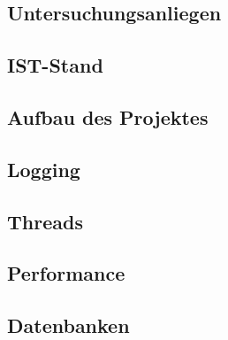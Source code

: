 \begin{spacing}{1}
    \section{Untersuchungsanliegen}\label{section:untersuchungsanliegenFlexlogger}
    \end{spacing}


\begin{spacing}{1}
    \section{IST-Stand}\label{section:ist-standFlexlogger}
    \end{spacing}


\begin{spacing}{1}
    \section{Aufbau des Projektes}\label{section:aufbaudesProjektesFlexlogger}
    \end{spacing}


\begin{spacing}{1}
    \section{Logging}\label{section:logging}
    \end{spacing}


\begin{spacing}{1}
    \section{Threads}\label{section:threads}
    \end{spacing}


\begin{spacing}{1}
    \section{Performance}\label{section:performance}
    \end{spacing}


\begin{spacing}{1}
    \section{Datenbanken}\label{section:database}
    \end{spacing}


